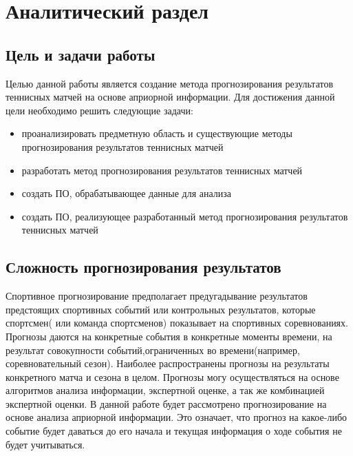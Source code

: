 \chapter{Аналитический раздел}
\label{cha:analysis}
\section{Цель и задачи работы}
Целью данной работы является создание метода прогнозирования результатов теннисных матчей на основе априорной информации.
Для достижения данной цели необходимо решить следующие задачи:
\begin{itemize}
	
\item проанализировать предметную область и существующие методы прогнозирования результатов теннисных матчей
	\item разработать метод прогнозирования результатов теннисных матчей
	\item создать ПО, обрабатывающее данные для анализа
	\item создать ПО, реализующее  разработанный метод прогнозирования результатов теннисных матчей
\end{itemize}
\section{Сложность прогнозирования результатов}
Спортивное прогнозирование предполагает предугадывание результатов предстоящих спортивных событий или контрольных результатов, которые спортсмен( или команда спортсменов) показывает на спортивных соревнованиях\cite{Book01}. Прогнозы даются на конкретные события в конкретные моменты времени, на результат совокупности событий,ограниченных во времени(например, соревновательный сезон). Наиболее распространены прогнозы на результаты конкретного матча и сезона в целом. Прогнозы могу осуществляться на основе алгоритмов анализа информации, экспертной оценке, а так же комбинацией экспертной оценки. В данной работе будет рассмотрено прогнозирование на основе анализа априорной информации. Это означает, что прогноз на какое-либо событие будет даваться до его начала и текущая информация о ходе события не будет учитываться.


